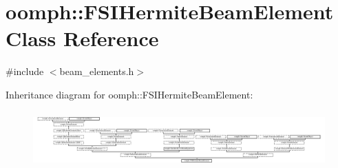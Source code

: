 \hypertarget{classoomph_1_1FSIHermiteBeamElement}{}\section{oomph\+:\+:F\+S\+I\+Hermite\+Beam\+Element Class Reference}
\label{classoomph_1_1FSIHermiteBeamElement}


{\ttfamily \#include $<$beam\+\_\+elements.\+h$>$}

Inheritance diagram for oomph\+:\+:F\+S\+I\+Hermite\+Beam\+Element\+:\begin{figure}[H]
\begin{center}
\leavevmode
\includegraphics[height=2.183236cm]{classoomph_1_1FSIHermiteBeamElement}
\end{center}
\end{figure}
